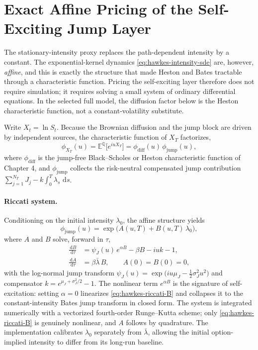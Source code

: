 \documentclass[a4paper,10pt,titlepage,oneside,openany]{book}
\theoremstyle{plain}
\theoremstyle{definition}
\theoremstyle{remark}
\newcommand{\E}{\mathbb{E}}
\newcommand{\Q}{\mathbb{Q}}
\newcommand{\dd}{\,\mathrm{d}}
\begin{document}
\section{Exact Affine Pricing of the Self-Exciting Jump Layer}

The stationary-intensity proxy replaces the path-dependent intensity by a constant. The exponential-kernel dynamics \eqref{eq:hawkes-intensity-sde} are, however, \emph{affine}, and this is exactly the structure that made Heston and Bates tractable through a characteristic function. Pricing the self-exciting layer therefore does not require simulation; it requires solving a small system of ordinary differential equations. In the selected full model, the diffusion factor below is the Heston characteristic function, not a constant-volatility substitute.

Write \(X_t=\ln S_t\). Because the Brownian diffusion and the jump block are driven by independent sources, the characteristic function of \(X_T\) factorizes,
\begin{equation}
    \phi_{X_T}(u)=\E^\Q\!\big[e^{iuX_T}\big]=\phi_{\mathrm{diff}}(u)\,\phi_{\mathrm{jump}}(u),
    \label{eq:hawkes-cf-factorization}
\end{equation}
where \(\phi_{\mathrm{diff}}\) is the jump-free Black--Scholes or Heston characteristic function of Chapter 4, and \(\phi_{\mathrm{jump}}\) collects the risk-neutral compensated jump contribution \(\sum_{j=1}^{N_T}J_j-k\int_0^T\lambda_s\,\dd s\).

\paragraph{Riccati system.}
Conditioning on the initial intensity \(\lambda_0\), the affine structure yields
\begin{equation}
    \phi_{\mathrm{jump}}(u)=\exp\!\big(A(u,T)+B(u,T)\,\lambda_0\big),
    \label{eq:hawkes-cf-affine}
\end{equation}
where \(A\) and \(B\) solve, forward in \(\tau\),
\begin{align}
    \frac{\dd B}{\dd\tau}
    &=
    \psi_J(u)\,e^{\alpha B}-\beta B-iuk-1,
    \label{eq:hawkes-riccati-B}\\
    \frac{\dd A}{\dd\tau}
    &=
    \beta\bar{\lambda}\,B,
    \qquad A(0)=B(0)=0,
    \label{eq:hawkes-riccati-A}
\end{align}
with the log-normal jump transform \(\psi_J(u)=\exp\!\big(iu\mu_J-\tfrac12\sigma_J^2u^2\big)\) and compensator \(k=e^{\mu_J+\sigma_J^2/2}-1\). The nonlinear term \(e^{\alpha B}\) is the signature of self-excitation: setting \(\alpha=0\) linearizes \eqref{eq:hawkes-riccati-B} and collapses it to the constant-intensity Bates jump transform in closed form. The system is integrated numerically with a vectorized fourth-order Runge--Kutta scheme; only \eqref{eq:hawkes-riccati-B} is genuinely nonlinear, and \(A\) follows by quadrature. The implementation calibrates \(\lambda_0\) separately from \(\bar{\lambda}\), allowing the initial option-implied intensity to differ from its long-run baseline.
\end{document}
